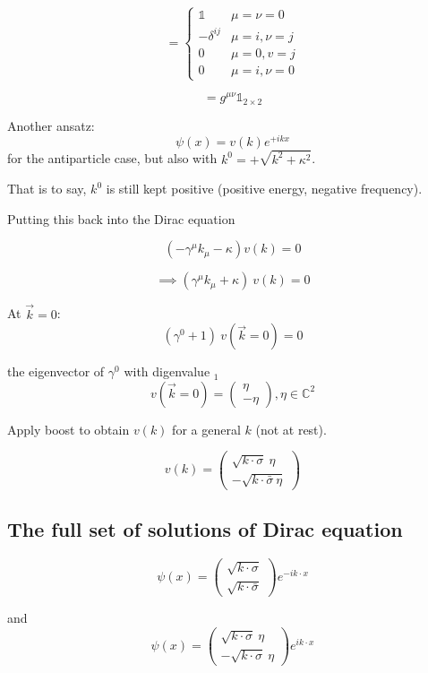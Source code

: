 \documentclass[11pt]{article}
\begin{document}
	
	\[ = \begin{cases}
		\mathbb{1} & \mu = \nu = 0\\
		-\delta^{ij}  & \mu = i, \nu = j\\
		0 & \mu = 0, v=j\\
		0 & \mu=i, \nu=0
	\end{cases}\]
	
	
	\[ = g^{\mu\nu} \mathbb{1}_{2\times 2}\]
	
	
	Another ansatz: \[ \psi(x) = v(k) e^{+ikx}\]
			for the antiparticle case, but also with $k^0 = + \sqrt{k^2 + \kappa^2}$.
			
			That is to say, $k^0$ is still kept positive (positive energy, negative frequency).
	
				Putting this back into the Dirac equation
				
				\[ (-\gamma^\mu k_\mu - \kappa) v(k) = 0 \]


				\[ \implies (\gamma^\mu k_\mu + \kappa)\ v(k) = 0 \]


			At $\vec{k} = 0$: \[ (\gamma^0 + 1)\ v(\vec{k} = 0) = 0 \]


		the eigenvector of $\gamma^0$ with digenvalue $_1$ \[ v(\vec{k} = 0) = \begin{pmatrix}
			\eta \\ -\eta
		\end{pmatrix}, \eta \in \mathbb{C}^2\]
	
	
		Apply boost to obtain $v(k)$ for a general $k$ (not at rest).
		
		\[ v(k) = \begin{pmatrix}
			\sqrt{k\cdot \sigma}\ \eta\\
			-\sqrt{k\cdot \bar{{\sigma}}\ \eta}
		\end{pmatrix}\]


		\subsection*{The full set of solutions of Dirac equation}
		
		 \[ \psi(x) = \begin{pmatrix}
		 	\sqrt{k\cdot \sigma}\\
		 	\sqrt{k\cdot \bar{\sigma}}
		 \end{pmatrix} e^{-ik\cdot x}\]
		
and \[ 
			\psi(x) = \begin{pmatrix}
				\sqrt{k\cdot \sigma}\ \eta \\
				- \sqrt{k\cdot \sigma}\ \eta 
			\end{pmatrix} e^{ik\cdot x}
		\]
		
\end{document}
